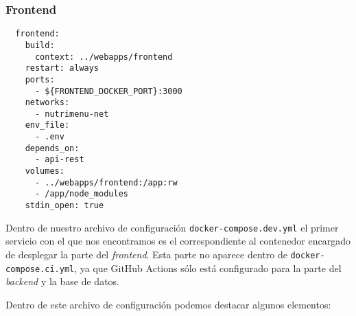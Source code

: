 \subsubsection{Frontend}

\begin{lstlisting}
  frontend:
    build:
      context: ../webapps/frontend
    restart: always
    ports:
      - ${FRONTEND_DOCKER_PORT}:3000
    networks:
      - nutrimenu-net
    env_file:
      - .env
    depends_on:
      - api-rest
    volumes:
      - ../webapps/frontend:/app:rw
      - /app/node_modules
    stdin_open: true	
\end{lstlisting}

Dentro de nuestro archivo de configuración \verb,docker-compose.dev.yml, el primer servicio con el que nos encontramos es el correspondiente al contenedor encargado de desplegar la parte del \textit{frontend}. Esta parte no aparece dentro de \verb,docker-compose.ci.yml,, ya que GitHub Actions sólo está configurado para la parte del \textit{backend} y la base de datos. 

Dentro de este archivo de configuración podemos destacar algunos elementos:

